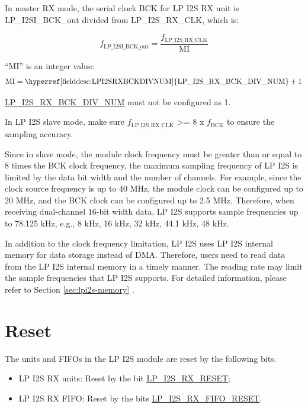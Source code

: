 \documentclass[main\_\_EN.tex]{subfiles}
\begin{document}
In master RX mode, the serial clock BCK for LP I2S RX unit is LP\_I2SI\_BCK\_out divided from LP\_I2S\_RX\_CLK, which is:

$$f_{\textrm{LP\_I2SI\_BCK\_out}} = \frac{f_{\textrm{LP\_I2S\_RX\_CLK}}}{\textrm{MI}}$$

``MI” is an integer value:
$$ \textrm{MI} = \textrm{\hyperref[fielddesc:LPI2SRXBCKDIVNUM]{LP\_I2S\_RX\_BCK\_DIV\_NUM}} + 1 $$

\vspace{-1em}
\begin{tiplisting}
\hyperref[fielddesc:LPI2SRXBCKDIVNUM]{LP\_I2S\_RX\_BCK\_DIV\_NUM} must not be configured as 1.
\end{tiplisting}
\vspace{-1em}

In LP I2S slave mode, make sure $f_{\textrm{LP\_I2S\_RX\_CLK}}$ >= 8 x $f_{\textrm{BCK}}$ to ensure the sampling accuracy.

Since in slave mode, the module clock frequency must be greater than or equal to 8 times the BCK clock frequency, the maximum sampling frequency of LP I2S is limited by the data bit width and the number of channels. For example, since the clock source frequency is up to 40 MHz, the module clock can be configured up to 20 MHz, and the BCK clock can be configured up to 2.5 MHz. Therefore, when receiving dual-channel 16-bit width data, LP I2S supports sample frequencies up to 78.125 kHz, e.g., 8 kHz, 16 kHz, 32 kHz, 44.1 kHz, 48 kHz.

In addition to the clock frequency limitation, LP I2S uses LP I2S internal memory for data storage instead of DMA. Therefore, users need to read data from the LP I2S internal memory in a timely manner. The reading rate may limit the sample frequencies that LP I2S supports. For detailed information, please refer to Section \ref{sec:lpi2s-memory} \textit{}.


\section{Reset} \label{sec:lpi2s-reset}

The units and FIFOs in the LP I2S module are reset by the following bits.

\begin{itemize}
    \item LP I2S RX units: Reset by the bit \hyperref[fielddesc:LPI2SRXRESET]{LP\_I2S\_RX\_RESET};
    \item LP I2S RX FIFO: Reset by the bits \hyperref[fielddesc:LPI2SRXFIFORESET]{LP\_I2S\_RX\_FIFO\_RESET}.
\end{itemize}
\end{document}
